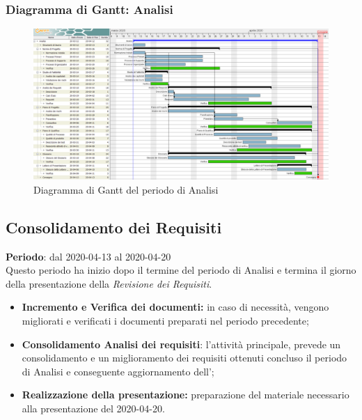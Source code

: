 	\subsubsection{Diagramma di Gantt: Analisi}
		\begin{figure}[h]
			\centering
			\includegraphics[width=1.1\textwidth]{./res/img/DiagrammiGantt/analisi_gantt.png}
			\caption{Diagramma di Gantt del periodo di Analisi}
		\end{figure}

\subsection{Consolidamento dei Requisiti}
\textbf{Periodo}: dal 2020-04-13 al 2020-04-20 \\
Questo periodo ha inizio dopo il termine del periodo di Analisi e termina il giorno della presentazione della \textit{Revisione dei Requisiti}. \\
\begin{itemize}
	\item \textbf{Incremento e Verifica dei documenti:} in caso di necessità, vengono migliorati e verificati i documenti preparati nel periodo precedente;
	\item \textbf{Consolidamento Analisi dei requisiti}: l'attività principale, prevede un consolidamento e un miglioramento dei requisiti ottenuti concluso il periodo di Analisi e conseguente aggiornamento dell'\textit{\AdR{}};
	\item \textbf{Realizzazione della presentazione:} preparazione del materiale necessario alla presentazione del 2020-04-20.
\end{itemize}
